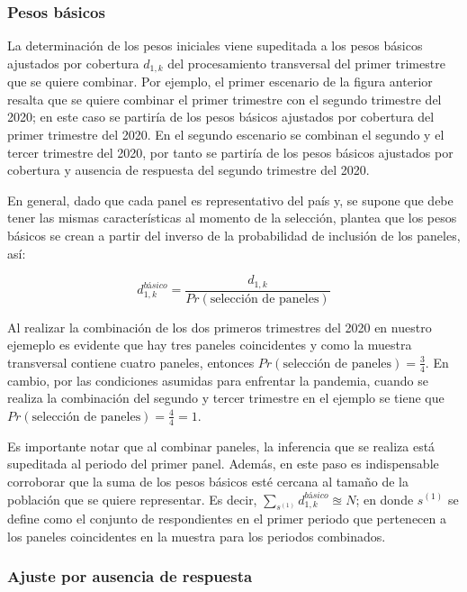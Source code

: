 \documentclass[
  10pt,
  spanish,
]{book}
\begin{document}
\hypertarget{pesos-buxe1sicos}{%
\subsubsection*{Pesos básicos}\label{pesos-buxe1sicos}}

La determinación de los pesos iniciales viene supeditada a los pesos básicos ajustados por cobertura \(d_{1, k}\) del procesamiento transversal del primer trimestre que se quiere combinar. Por ejemplo, el primer escenario de la figura anterior resalta que se quiere combinar el primer trimestre con el segundo trimestre del 2020; en este caso se partiría de los pesos básicos ajustados por cobertura del primer trimestre del 2020. En el segundo escenario se combinan el segundo y el tercer trimestre del 2020, por tanto se partiría de los pesos básicos ajustados por cobertura y ausencia de respuesta del segundo trimestre del 2020.

En general, dado que cada panel es representativo del país y, se supone que debe tener las mismas características al momento de la selección, \citet{LaRoche_2003} plantea que los pesos básicos se crean a partir del inverso de la probabilidad de inclusión de los paneles, así:

\[
d_{1, k}^{básico} = \frac{d_{1, k}}{Pr(\text{selección de paneles})}
\]

Al realizar la combinación de los dos primeros trimestres del 2020 en nuestro ejemeplo es evidente que hay tres paneles coincidentes y como la muestra transversal contiene cuatro paneles, entonces \(Pr(\text{selección de paneles}) = \frac{3}{4}\). En cambio, por las condiciones asumidas para enfrentar la pandemia, cuando se realiza la combinación del segundo y tercer trimestre en el ejemplo se tiene que \(Pr(\text{selección de paneles}) = \frac{4}{4} = 1\).

Es importante notar que al combinar paneles, la inferencia que se realiza está supeditada al periodo del primer panel. Además, en este paso es indispensable corroborar que la suma de los pesos básicos esté cercana al tamaño de la población que se quiere representar. Es decir, \(\sum_{s^{(1)}} d_{1, k}^{básico} \approxeq N\); en donde \(s^{(1)}\) se define como el conjunto de respondientes en el primer periodo que pertenecen a los paneles coincidentes en la muestra para los periodos combinados.

\hypertarget{ajuste-por-ausencia-de-respuesta-1}{%
\subsubsection*{Ajuste por ausencia de respuesta}\label{ajuste-por-ausencia-de-respuesta-1}}
\end{document}
